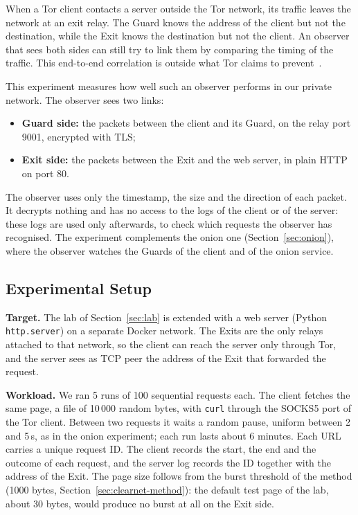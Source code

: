 \documentclass[10pt,a4paper]{article}
\numberwithin{figure}{section}
\numberwithin{table}{section}
\begin{document}
When a Tor client contacts a server outside the Tor network, its traffic leaves
the network at an exit relay. The Guard knows the address of the client but not
the destination, while the Exit knows the destination but not the client. An
observer that sees both sides can still try to link them by comparing the timing
of the traffic. This end-to-end correlation is outside what Tor claims to
prevent~\cite{dingledine2004tor}.

This experiment measures how well such an observer performs in our private
network. The observer sees two links:
\begin{itemize}
    \item \textbf{Guard side:} the packets between the client and its Guard, on
    the relay port 9001, encrypted with TLS;
    \item \textbf{Exit side:} the packets between the Exit and the web server, in
    plain HTTP on port 80.
\end{itemize}
The observer uses only the timestamp, the size and the direction of each packet.
It decrypts nothing and has no access to the logs of the client or of the
server: these logs are used only afterwards, to check which requests the
observer has recognised. The experiment complements the onion one
(Section~\ref{sec:onion}), where the observer watches the Guards of the client
and of the onion service.

\subsection{Experimental Setup}
\label{sec:clearnet-setup}

\textbf{Target.} The lab of Section~\ref{sec:lab} is extended with a web server
(Python \texttt{http.server}) on a separate Docker network. The Exits are the only
relays attached to that network, so the client can reach the server only through
Tor, and the server sees as TCP peer the address of the Exit that forwarded the
request.

\textbf{Workload.} We ran 5 runs of 100 sequential requests each. The client
fetches the same page, a file of 10\,000 random bytes, with \texttt{curl} through
the SOCKS5 port of the Tor client. Between two requests it waits a random pause,
uniform between 2 and 5\,s, as in the onion experiment; each run lasts about
6 minutes. Each URL carries a unique request ID. The client records the start, the
end and the outcome of each request, and the server log records the ID together
with the address of the Exit. The page size follows from the burst threshold of
the method (1000 bytes, Section~\ref{sec:clearnet-method}): the default test page
of the lab, about 30 bytes, would produce no burst at all on the Exit side.
\end{document}
